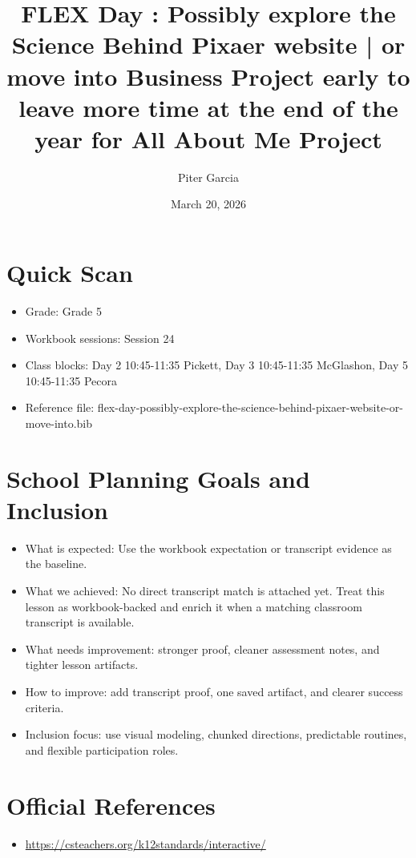 \documentclass[11pt]{article}
\title{FLEX Day : Possibly explore the Science Behind Pixaer website | or move into Business Project early to leave more time at the end of the year for All About Me Project}
\author{Piter Garcia}
\date{March 20, 2026}
\begin{document}
\maketitle
\section*{Quick Scan}
\begin{itemize}[leftmargin=*]
\item Grade: Grade 5
\item Workbook sessions: Session 24
\item Class blocks: Day 2 10:45-11:35 Pickett, Day 3 10:45-11:35 McGlashon, Day 5 10:45-11:35 Pecora
\item Reference file: flex-day-possibly-explore-the-science-behind-pixaer-website-or-move-into.bib
\end{itemize}
\section*{School Planning Goals and Inclusion}
\begin{itemize}[leftmargin=*]
\item What is expected: Use the workbook expectation or transcript evidence as the baseline.
\item What we achieved: No direct transcript match is attached yet. Treat this lesson as workbook-backed and enrich it when a matching classroom transcript is available.
\item What needs improvement: stronger proof, cleaner assessment notes, and tighter lesson artifacts.
\item How to improve: add transcript proof, one saved artifact, and clearer success criteria.
\item Inclusion focus: use visual modeling, chunked directions, predictable routines, and flexible participation roles.
\end{itemize}
\section*{Official References}
\begin{itemize}[leftmargin=*]
\item \url{https://csteachers.org/k12standards/interactive/}

\end{itemize}
\end{document}
